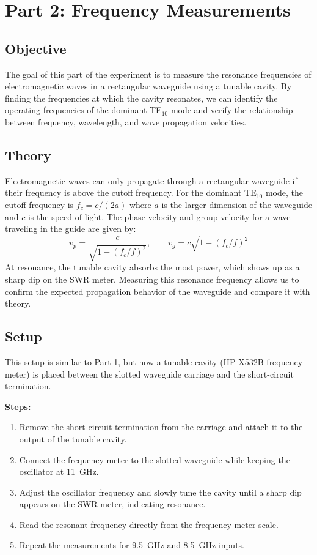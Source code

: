 \documentclass[11pt,letterpaper]{article}
\begin{document}
\newpage

\section{Part 2: Frequency Measurements}

\subsection*{Objective}

The goal of this part of the experiment is to measure the resonance frequencies of electromagnetic waves in a rectangular waveguide using a tunable cavity. By finding the frequencies at which the cavity resonates, we can identify the operating frequencies of the dominant TE$_{10}$ mode and verify the relationship between frequency, wavelength, and wave propagation velocities.

\subsection*{Theory}

Electromagnetic waves can only propagate through a rectangular waveguide if their frequency is above the cutoff frequency. For the dominant TE$_{10}$ mode, the cutoff frequency is $f_c = c/(2a)$ where $a$ is the larger dimension of the waveguide and $c$ is the speed of light. The phase velocity and group velocity for a wave traveling in the guide are given by:
\[
v_p = \frac{c}{\sqrt{1 - (f_c/f)^2}}, \qquad v_g = c\sqrt{1 - (f_c/f)^2}
\]
At resonance, the tunable cavity absorbs the most power, which shows up as a sharp dip on the SWR meter. Measuring this resonance frequency allows us to confirm the expected propagation behavior of the waveguide and compare it with theory.

\subsection*{Setup}

This setup is similar to Part 1, but now a tunable cavity (HP X532B frequency meter) is placed between the slotted waveguide carriage and the short-circuit termination.

\textbf{Steps:}
\begin{enumerate}[leftmargin=*]
  \item Remove the short-circuit termination from the carriage and attach it to the output of the tunable cavity.
  \item Connect the frequency meter to the slotted waveguide while keeping the oscillator at 11~GHz.
  \item Adjust the oscillator frequency and slowly tune the cavity until a sharp dip appears on the SWR meter, indicating resonance.
  \item Read the resonant frequency directly from the frequency meter scale.
  \item Repeat the measurements for 9.5~GHz and 8.5~GHz inputs.
\end{enumerate}
\end{document}
